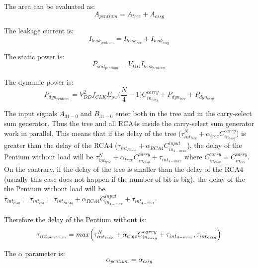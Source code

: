 The area can be evaluated as:
\begin{equation}
A_{pentium} = A_{tree} + A_{cssg}
\end{equation}

The leakage current is:
\begin{equation}
I_{leak_{pentium}} = I_{leak_{tree}} + I_{leak_{cssg}}
\end{equation}

The static power is:
\begin{equation}
P_{stat_{pentium}} = V_{DD} I_{leak_{pentium}}
\end{equation}

The dynamic power is:
\begin{equation}
P_{dyn_{pentium}} = V_{DD}^2 f_{CLK} E_{sw} \Biggl(\frac{N}{4} - 1\Biggr)C_{in_{cssg}}^{carry} + P_{dyn_{tree}} + P_{dyn_{cssg}}
\end{equation}

The input signals $A_{31-0}$ and $B_{31-0}$ enter both in the tree and in the carry-select sum generator. Thus the tree and all RCA4s inside the carry-select sum generator work in parallel. This means that if the delay of the tree ($\tau_{int_{tree}}^{N}+\alpha_{tree}C_{in_{cssg}}^{carry}$) is greater than the delay of the RCA4 ($\tau_{int_{RCA4}} + \alpha_{RCA4} C_{in_{4-mux}}^{input}$), the delay of the Pentium without load will be $\tau_{int_{tree}}^{N}+\alpha_{tree}C_{in_{cssg}}^{carry}+\tau_{int_{4-mux}}$ where $C_{in_{cssg}}^{carry} = C_{in_{csb}}^{carry}$. On the contrary, if the delay of the tree is smaller than the delay of the RCA4 (usually this case does not happen if the number of bit is big), the delay of the the Pentium without load will be $\tau_{int_{cssg}} = \tau_{int_{csb}} = \tau_{int_{RCA4}} + \alpha_{RCA4} C_{in_{4-mux}}^{input} + \tau_{int_{4-mux}}$.\\\\
Therefore the delay of the Pentium without is:
\begin{equation}
\tau_{int_{pentium}} = max \Bigl( \tau_{int_{tree}}^{N} + \alpha_{tree} C_{in_{cssg}}^{carry} + \tau_{int_{4-mux}}, \tau_{int_{cssg}} \Bigr)
\end{equation}

The $\alpha$ parameter is:
\begin{equation}
\alpha_{pentium} = \alpha_{cssg}
\end{equation}

